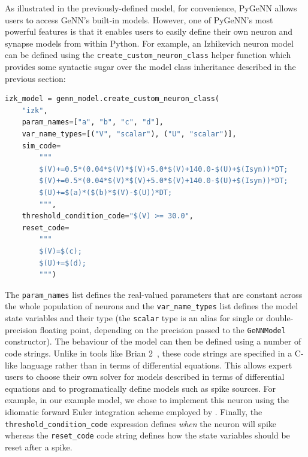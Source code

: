 \documentclass[utf8]{frontiersSCNS} %
\begin{document}
As illustrated in the previously-defined model, for convenience, PyGeNN allows users to access GeNN's built-in models.
However, one of PyGeNN's most powerful features is that it enables users to easily define their own neuron and synapse models from within Python.
For example, an Izhikevich neuron model~\citep{Izhikevich2003a} can be defined using the \lstinline{create_custom_neuron_class} helper function which provides some syntactic sugar over the model class inheritance described in the previous section:
%
\begin{lstlisting}[language=Python]
izk_model = genn_model.create_custom_neuron_class(
    "izk",
    param_names=["a", "b", "c", "d"],
    var_name_types=[("V", "scalar"), ("U", "scalar")],
    sim_code=
        """
        $(V)+=0.5*(0.04*$(V)*$(V)+5.0*$(V)+140.0-$(U)+$(Isyn))*DT;
        $(V)+=0.5*(0.04*$(V)*$(V)+5.0*$(V)+140.0-$(U)+$(Isyn))*DT;
        $(U)+=$(a)*($(b)*$(V)-$(U))*DT;
        """,
    threshold_condition_code="$(V) >= 30.0",
    reset_code=
        """
        $(V)=$(c);
        $(U)+=$(d);
        """)
\end{lstlisting}
%
The \lstinline{param_names} list defines the real-valued parameters that are constant across the whole population of neurons and the \lstinline{var_name_types} list defines the model state variables and their type (the \lstinline{scalar} type is an alias for single or double-precision floating point, depending on the precision passed to the \lstinline{GeNNModel} constructor).
The behaviour of the model can then be defined using a number of code strings.
Unlike in tools like Brian 2~\citep{Stimberg2019}, these code strings are specified in a C-like language rather than in terms of differential equations.
This allows expert users to choose their own solver for models described in terms of differential equations and to programatically define models such as spike sources.
For example, in our example model, we chose to implement this neuron using the idiomatic forward Euler integration scheme employed by \citet{Izhikevich2003a}.
Finally, the \lstinline{threshold_condition_code} expression defines \emph{when} the neuron will spike whereas the \lstinline{reset_code} code string defines how the state variables should be reset after a spike.
%
\end{document}
